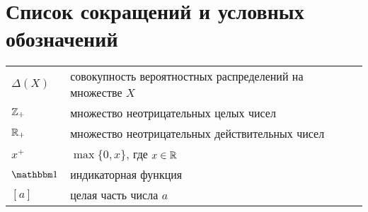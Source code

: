 \chapter*{Список сокращений и условных обозначений}             %



\begin{tabular}{p{3cm}p{12.5cm}}
  $\Delta(X)$ & совокупность вероятностных распределений на множестве $X$ \\
  $\mathbb{Z}_+$ & множество неотрицательных целых чисел \\
  $\mathbb{R}_+$ & множество неотрицательных действительных чисел \\
  $x^+$ & $\max\{0, x\}$, где $x \in \mathbb{R}$ \\
  $\Ind$ & индикаторная функция \\
  $[a]$ & целая часть числа $a$
\end{tabular}

